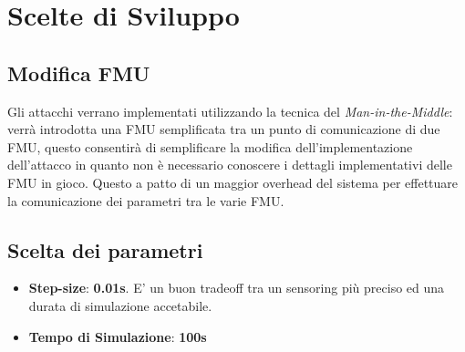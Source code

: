 \section{Scelte di Sviluppo}
\subsection{Modifica FMU}
Gli attacchi verrano implementati utilizzando la tecnica del \textit{Man-in-the-Middle}: verrà introdotta una FMU semplificata tra un punto di comunicazione di due FMU, questo consentirà di semplificare la modifica dell'implementazione dell'attacco in quanto non è necessario conoscere i dettagli implementativi delle FMU in gioco. Questo a patto di un maggior overhead del sistema per effettuare la comunicazione dei parametri tra le varie FMU.
\subsection{Scelta dei parametri}

\begin{itemize}
	\item \textbf{Step-size}: \textbf{0.01s}. E' un buon tradeoff tra un sensoring più preciso ed una durata di simulazione accetabile.
	\item \textbf{Tempo di Simulazione}: \textbf{100s}
\end{itemize}
